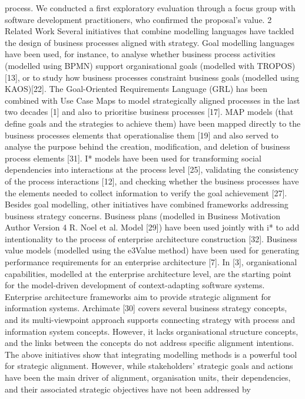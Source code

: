 process. We conducted a first exploratory evaluation through a focus group with
software development practitioners, who confirmed the proposal’s value.
2 Related Work
Several initiatives that combine modelling languages have tackled the design
of business processes aligned with strategy. Goal modelling languages have been
used, for instance, to analyse whether business process activities (modelled using
BPMN) support organisational goals (modelled with TROPOS) [13], or to study
how business processes constraint business goals (modelled using KAOS)[22].
The Goal-Oriented Requirements Language (GRL) has been combined with Use
Case Maps to model strategically aligned processes in the last two decades [1] and
also to prioritise business processes [17]. MAP models (that define goals and the
strategies to achieve them) have been mapped directly to the business processes
elements that operationalise them [19] and also served to analyse the purpose
behind the creation, modification, and deletion of business process elements [31].
I* models have been used for transforming social dependencies into interactions
at the process level [25], validating the consistency of the process interactions
[12], and checking whether the business processes have the elements needed to
collect information to verify the goal achievement [27].
Besides goal modelling, other initiatives have combined frameworks addressing business strategy concerns. Business plans (modelled in Business Motivation
Author Version
4 R. Noel et al.
Model [29]) have been used jointly with i* to add intentionality to the process of
enterprise architecture construction [32]. Business value models (modelled using
the e3Value method) have been used for generating performance requirements
for an enterprise architecture [7]. In [3], organisational capabilities, modelled
at the enterprise architecture level, are the starting point for the model-driven
development of context-adapting software systems.
Enterprise architecture frameworks aim to provide strategic alignment for
information systems. Archimate [30] covers several business strategy concepts,
and its multi-viewpoint approach supports connecting strategy with process and
information system concepts. However, it lacks organisational structure concepts,
and the links between the concepts do not address specific alignment intentions.
The above initiatives show that integrating modelling methods is a powerful
tool for strategic alignment. However, while stakeholders’ strategic goals and
actions have been the main driver of alignment, organisation units, their dependencies, and their associated strategic objectives have not been addressed by
